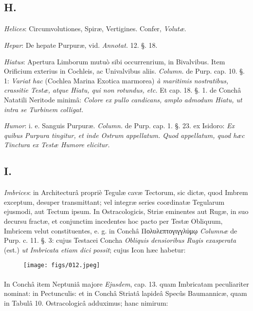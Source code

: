 \documentclass[a4paper, 11pt, oneside, polutonikogreek, german]{article}
\begin{document}
\subsection{H.}
\paragraph{}
\emph{Helices}: Circumvolutiones, Spiræ, Vertigines. Confer, \emph{Volutæ}.

\emph{Hepar}: De hepate Purpuræ, vid. \emph{Annotat.} 12. §. 18.

\emph{Hiatus}: Apertura Limborum mutuò sibi occurrenrium, in Bivalvibus. Item Orificium exterius in Cochleis, ac Univalvibus aliis. \emph{Column.} de Purp. cap. 10. §. 1: \emph{Variat hac} (Cochlea Marina Exotica marmorea) \emph{à maritimis nostratibus, crassitie Testæ, atque Hiatu, qui non rotundus, etc.} Et cap. 18. §. 1. de Conchâ Natatili Neritode minimâ: \emph{Colore ex pullo candicans, amplo admodum Hiatu, ut intra se Turbinem colligat.}

\emph{Humor}: i. e. Sanguis Purpuræ. \emph{Column.} de Purp. cap. 1. §. 23. ex Isidoro: \emph{Ex quibus Purpura tingitur, et inde Ostrum appellatum. Quod appellatum, quod hæc Tinctura ex Testæ Humore elicitur.}

\subsection{I.}
\paragraph{}
\emph{Imbrices}: in Architecturâ propriè Tegulæ cavæ Tectorum, sic dictæ, quod Imbrem exceptum, desuper transmittant; vel integræ series coordinatæ Tegularum ejusmodi, aut Tectum ipsum. In Ostracologicis, Striæ eminentes aut Rugæ, in suo decursu fractæ, et conjunctim incedentes hoc pacto per Testæ Obliquum, Imbricem velut constituentes, e. g. in Conchâ Πολυλεπτογιγγλύμῳ \emph{Columnæ} de Purp. c. 11. §. 3: cujus Testacei Concha \emph{Obliquis densioribus Rugis exasperata} (est.) \emph{ut Imbricata etiam dici possit}; cujus Icon hæc habetur:

\begin{figure}[H]
\centering
\texttt{[image: figs/012.jpeg]}
\end{figure}
\paragraph{}
In Conchâ item Neptuniâ majore \emph{Ejusdem}, cap. 13. quam Imbricatam peculiariter nominat: in Pectunculis: et in Conchâ Striatâ lapideâ Specûs Baumannicæ, quam in Tabulâ 10. Ostracologicâ adduximus; hanc nimirum:
\end{document}
